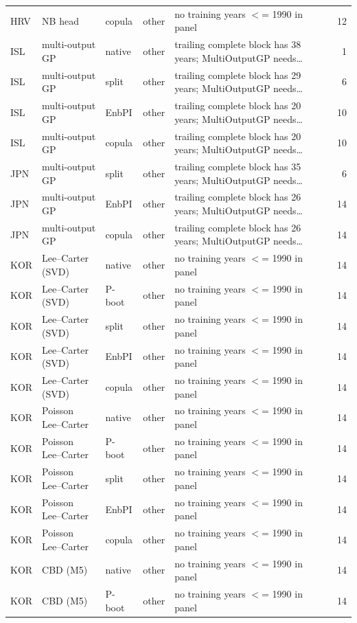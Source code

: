 {\begin{longtable}{@{}lllp{1.6cm}p{6.2cm}r@{}}
HRV & NB head & copula & other & no training years $<$= 1990 in panel & 12 \\
ISL & multi-output GP & native & other & trailing complete block has 38 years; MultiOutputGP needs\ldots & 1 \\
ISL & multi-output GP & split & other & trailing complete block has 29 years; MultiOutputGP needs\ldots & 6 \\
ISL & multi-output GP & EnbPI & other & trailing complete block has 20 years; MultiOutputGP needs\ldots & 10 \\
ISL & multi-output GP & copula & other & trailing complete block has 20 years; MultiOutputGP needs\ldots & 10 \\
JPN & multi-output GP & split & other & trailing complete block has 35 years; MultiOutputGP needs\ldots & 6 \\
JPN & multi-output GP & EnbPI & other & trailing complete block has 26 years; MultiOutputGP needs\ldots & 14 \\
JPN & multi-output GP & copula & other & trailing complete block has 26 years; MultiOutputGP needs\ldots & 14 \\
KOR & Lee--Carter (SVD) & native & other & no training years $<$= 1990 in panel & 14 \\
KOR & Lee--Carter (SVD) & P-boot & other & no training years $<$= 1990 in panel & 14 \\
KOR & Lee--Carter (SVD) & split & other & no training years $<$= 1990 in panel & 14 \\
KOR & Lee--Carter (SVD) & EnbPI & other & no training years $<$= 1990 in panel & 14 \\
KOR & Lee--Carter (SVD) & copula & other & no training years $<$= 1990 in panel & 14 \\
KOR & Poisson Lee--Carter & native & other & no training years $<$= 1990 in panel & 14 \\
KOR & Poisson Lee--Carter & P-boot & other & no training years $<$= 1990 in panel & 14 \\
KOR & Poisson Lee--Carter & split & other & no training years $<$= 1990 in panel & 14 \\
KOR & Poisson Lee--Carter & EnbPI & other & no training years $<$= 1990 in panel & 14 \\
KOR & Poisson Lee--Carter & copula & other & no training years $<$= 1990 in panel & 14 \\
KOR & CBD (M5) & native & other & no training years $<$= 1990 in panel & 14 \\
KOR & CBD (M5) & P-boot & other & no training years $<$= 1990 in panel & 14 \\

\end{longtable}}
